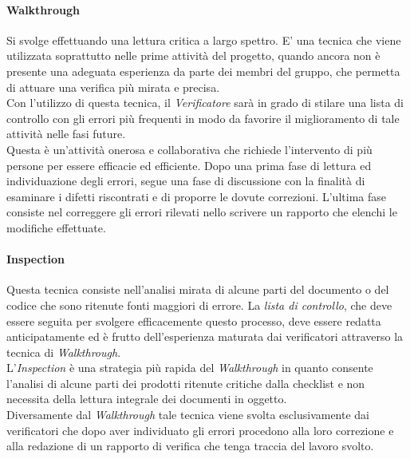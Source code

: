 \paragraph{Walkthrough}
Si svolge effettuando una lettura critica a largo spettro. E' una tecnica che viene utilizzata soprattutto nelle prime attività del progetto, quando ancora non è presente una adeguata esperienza da parte dei membri del gruppo, che permetta di attuare una verifica più mirata e precisa.\\
Con l'utilizzo di questa tecnica, il \textit{Verificatore} sarà in grado di stilare una lista di controllo con gli errori più frequenti in modo da favorire il miglioramento di tale attività nelle fasi future.\\
Questa è un'attività onerosa e collaborativa che richiede l'intervento di più persone per essere efficacie ed efficiente. Dopo una prima fase di lettura ed individuazione degli errori, segue una fase di discussione con la finalità di esaminare i difetti riscontrati e di proporre le dovute correzioni. L'ultima fase consiste nel correggere gli errori rilevati nello scrivere un rapporto che elenchi le modifiche effettuate.

\paragraph{Inspection}
Questa tecnica consiste nell'analisi mirata di alcune parti del documento o del codice che sono ritenute fonti maggiori di errore. La \textit{lista di controllo}, che deve essere seguita per svolgere efficacemente questo processo, deve essere redatta anticipatamente ed è frutto dell'esperienza maturata dai verificatori attraverso la tecnica di \textit{Walkthrough}.\\
L'\textit{Inspection} è una strategia più rapida del \textit{Walkthrough} in quanto consente l'analisi di alcune parti dei prodotti ritenute critiche dalla checklist e non necessita della lettura integrale dei documenti in oggetto.\\
Diversamente dal \textit{Walkthrough} tale tecnica viene svolta esclusivamente dai verificatori che dopo aver individuato gli errori procedono alla loro correzione e alla redazione di un rapporto di verifica che tenga traccia del lavoro svolto.

